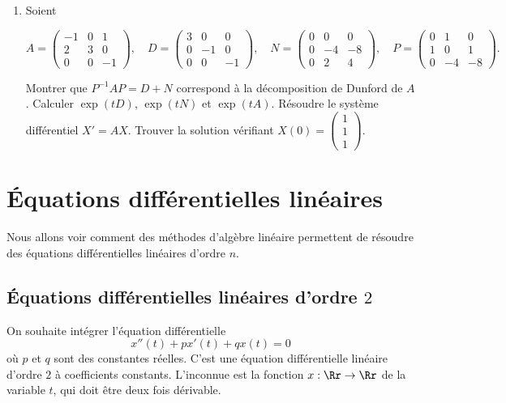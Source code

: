 \documentclass[12pt, class=report,crop=false]{standalone}
\begin{document}
\begin{miniexercices}
\begin{enumerate}
  \item Soient \\
  \centerline{$
  A =  \left(\begin{smallmatrix} 
  -1 & 0 & 1 \\
2 & 3 & 0 \\
0 & 0 & -1
\end{smallmatrix}\right),
\quad
D = \left(\begin{smallmatrix}
3 & 0 & 0 \\
0 & -1 & 0 \\
0 & 0 & -1
\end{smallmatrix}\right),
\quad
N = \left(\begin{smallmatrix}
0 & 0 & 0 \\
0 & -4 & -8 \\
0 & 2 & 4
\end{smallmatrix}\right),
\quad
P = \left(\begin{smallmatrix}
0 & 1 & 0 \\
1 & 0 & 1 \\
0 & -4 & -8
\end{smallmatrix}\right).
 $ }
 Montrer que $P^{-1}AP = D +N$ correspond à la décomposition de Dunford de $A$.
 Calculer $\exp(tD)$, $\exp(tN)$ et $\exp(tA)$. 
 Résoudre le système différentiel $X'=AX$. 
 Trouver la solution vérifiant $X(0) = \left(\begin{smallmatrix} 1\\1\\1\end{smallmatrix}\right)$.
\end{enumerate}
\end{miniexercices}



\section{\'Equations différentielles linéaires}

Nous allons voir comment des méthodes d'algèbre linéaire 
permettent de résoudre des équations différentielles linéaires d'ordre $n$.


\subsection{\'Equations différentielles linéaires d'ordre $2$}

On souhaite intégrer l'équation différentielle
\begin{equation}
x''(t)+px'(t)+qx(t)=0
\label{eq:eqdifflin2}\tag{$E$}
\end{equation}
où $p$ et $q$ sont des constantes réelles.
C'est une équation différentielle linéaire d'ordre $2$ à coefficients constants.
L'inconnue est la fonction $x : \Rr \to \Rr$ de la variable $t$, qui doit être deux fois dérivable.
\end{document}

